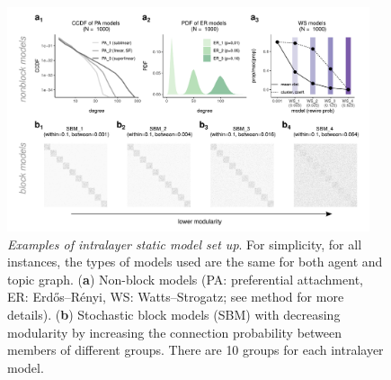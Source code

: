 \begin{figure}[H]
    \centering
    \includegraphics[width=0.95\textwidth,center]{../figures/report/Fig2.pdf}
    \caption{\label{fig:2}
    \textit{Examples of intralayer static model set up}. For simplicity, for all instances, the types of models used are the same for both agent and topic graph.
    (\textbf{a}) Non-block models (PA: preferential attachment, ER: Erdős–Rényi, WS: Watts–Strogatz; see method for more details). (\textbf{b}) Stochastic block models (SBM) with decreasing modularity by increasing the connection probability between members of different groups. There are 10 groups for each intralayer model.
    }
\end{figure}